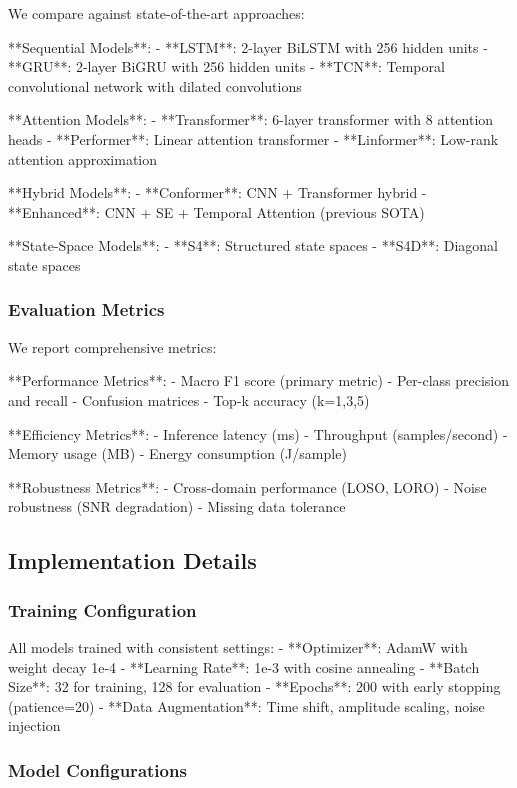 \documentclass[10pt,journal,compsoc]{IEEEtran}
\begin{document}
We compare against state-of-the-art approaches:

**Sequential Models**:
- **LSTM**: 2-layer BiLSTM with 256 hidden units
- **GRU**: 2-layer BiGRU with 256 hidden units
- **TCN**: Temporal convolutional network with dilated convolutions

**Attention Models**:
- **Transformer**: 6-layer transformer with 8 attention heads
- **Performer**: Linear attention transformer
- **Linformer**: Low-rank attention approximation

**Hybrid Models**:
- **Conformer**: CNN + Transformer hybrid
- **Enhanced**: CNN + SE + Temporal Attention (previous SOTA)

**State-Space Models**:
- **S4**: Structured state spaces
- **S4D**: Diagonal state spaces

\subsubsection{Evaluation Metrics}

We report comprehensive metrics:

**Performance Metrics**:
- Macro F1 score (primary metric)
- Per-class precision and recall
- Confusion matrices
- Top-k accuracy (k=1,3,5)

**Efficiency Metrics**:
- Inference latency (ms)
- Throughput (samples/second)
- Memory usage (MB)
- Energy consumption (J/sample)

**Robustness Metrics**:
- Cross-domain performance (LOSO, LORO)
- Noise robustness (SNR degradation)
- Missing data tolerance

\subsection{Implementation Details}

\subsubsection{Training Configuration}

All models trained with consistent settings:
- **Optimizer**: AdamW with weight decay 1e-4
- **Learning Rate**: 1e-3 with cosine annealing
- **Batch Size**: 32 for training, 128 for evaluation
- **Epochs**: 200 with early stopping (patience=20)
- **Data Augmentation**: Time shift, amplitude scaling, noise injection

\subsubsection{Model Configurations}
\end{document}
